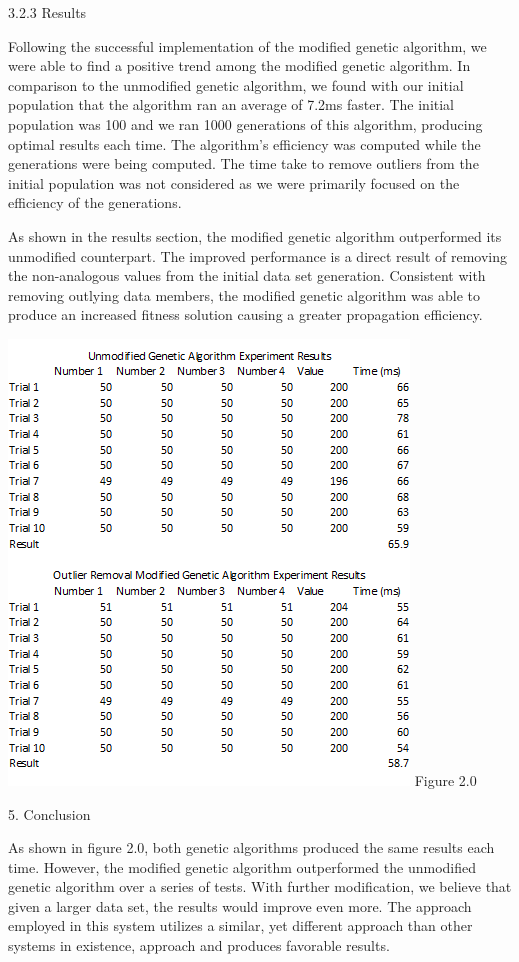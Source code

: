 \documentclass[conference]{IEEEtran}
\begin{document}
3.2.3 Results

Following the successful implementation of the modified genetic algorithm, we were able to find a positive trend among the modified genetic algorithm. In comparison to the unmodified genetic algorithm, we found with our initial population that the algorithm ran an average of 7.2ms faster. The initial population was 100 and we ran 1000 generations of this algorithm, producing optimal results each time. The algorithm's efficiency was computed while the generations were being computed. The time take to remove outliers from the initial population was not considered as we were primarily focused on the efficiency of the generations. 

As shown in the results section, the modified genetic algorithm outperformed its unmodified counterpart. The improved performance is a direct result of removing the non-analogous values from the initial data set generation. Consistent with removing outlying data members, the modified genetic algorithm was able to produce an increased fitness solution causing a greater propagation efficiency.

\includegraphics[scale=0.8]{GA}
Figure 2.0

\large 5. Conclusion

As shown in figure 2.0, both genetic algorithms produced the same results each time. However, the modified genetic algorithm outperformed the unmodified genetic algorithm over a series of tests. With further modification, we believe that given a larger data set, the results would improve even more. The approach employed in this system utilizes a similar, yet different approach than other systems in existence, approach and produces favorable results. 
\end{document}
